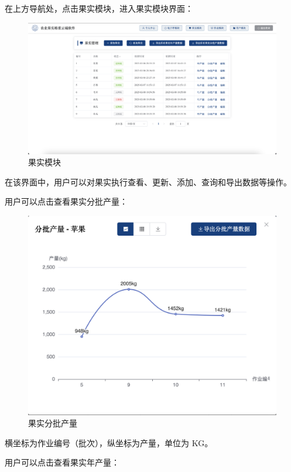 \documentclass{xduugmr}
\begin{document}
在上方导航处，点击果实模块，进入果实模块界面：

\begin{figure}[H]
    \centering
    \includegraphics[width=0.8\linewidth]{../result/果实模块.png}
    \caption{果实模块}
    \label{fig:果实模块}
\end{figure}

在该界面中，用户可以对果实执行查看、更新、添加、查询和导出数据等操作。

用户可以点击查看果实分批产量：

\begin{figure}[H]
    \centering
    \includegraphics[width=0.8\linewidth]{../result/果实分批产量.png}
    \caption{果实分批产量}
    \label{fig:果实分批产量}
\end{figure}

横坐标为作业编号（批次），纵坐标为产量，单位为 KG。

用户可以点击查看果实年产量：
\end{document}
